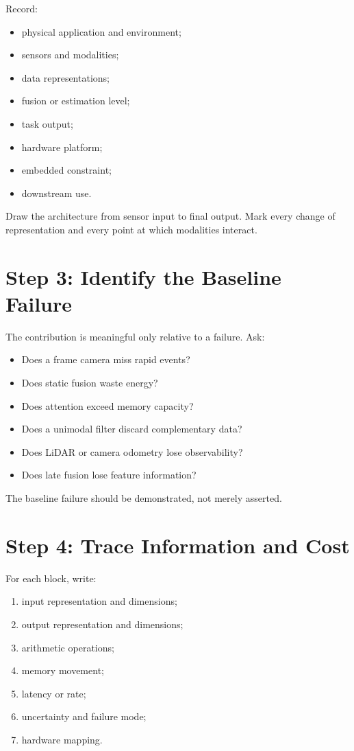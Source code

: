 Record:

\begin{itemize}
    \item physical application and environment;
    \item sensors and modalities;
    \item data representations;
    \item fusion or estimation level;
    \item task output;
    \item hardware platform;
    \item embedded constraint;
    \item downstream use.
\end{itemize}

Draw the architecture from sensor input to final output. Mark every change of representation and every point at which modalities interact.

\section{Step 3: Identify the Baseline Failure}

The contribution is meaningful only relative to a failure. Ask:

\begin{itemize}
    \item Does a frame camera miss rapid events?
    \item Does static fusion waste energy?
    \item Does attention exceed memory capacity?
    \item Does a unimodal filter discard complementary data?
    \item Does LiDAR or camera odometry lose observability?
    \item Does late fusion lose feature information?
\end{itemize}

The baseline failure should be demonstrated, not merely asserted.

\section{Step 4: Trace Information and Cost}

For each block, write:

\begin{enumerate}[label=\alph*)]
    \item input representation and dimensions;
    \item output representation and dimensions;
    \item arithmetic operations;
    \item memory movement;
    \item latency or rate;
    \item uncertainty and failure mode;
    \item hardware mapping.
\end{enumerate}

